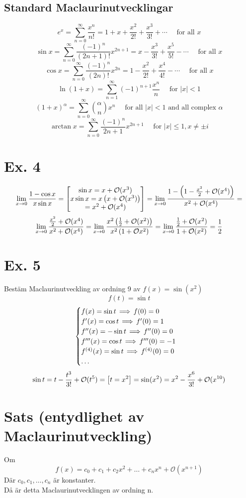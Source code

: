 \documentclass{article}
\newcommand{\Or}{{\mathcal{O}}}
\begin{document}
  \subsection{Standard Maclaurinutvecklingar}
  $$ e^{x} = \sum^{\infty}_{n=0} \frac{x^n}{n!} = 1 + x + \frac{x^2}{2!} + \frac{x^3}{3!} + \cdots\quad\text{ for all } x\! $$
  $$ \sin x = \sum^{\infty}_{n=0} \frac{(-1)^n}{(2n+1)!} x^{2n+1} = x - \frac{x^3}{3!} + \frac{x^5}{5!} - \cdots\quad\text{ for all } x\! $$
  $$ \cos x = \sum^{\infty}_{n=0} \frac{(-1)^n}{(2n)!} x^{2n} = 1 - \frac{x^2}{2!} + \frac{x^4}{4!} - \cdots\quad\text{ for all } x\! $$
  $$ \ln(1+x) = \sum^\infty_{n=1} (-1)^{n+1}\frac{x^n}n\quad\text{ for } |x| < 1 $$
  $$ (1+x)^\alpha = \sum_{n=0}^\infty {\alpha \choose n} x^n\quad\text{ for all }|x| < 1 \text{ and all complex } \alpha\! $$
  $$ \arctan x = \sum^{\infty}_{n=0} \frac{(-1)^n}{2n+1} x^{2n+1}\quad\text{ for }|x| \le 1, x\not=\pm i\! $$

  \section{Ex. 4}
  $$ \lim_{x \to 0} \f{1-\cos x}{x \sin x} = \bmat{ \sin x = x+\Or(x^3)\\ x\sin x = x\pa{x+\Or(x^3)}\\ = x^2 + \Or(x^4) } = \lim_{x\to 0} \f{1-\pa{1-\f {x^2}2 + \Or(x^4) }}{x^2 + \Or(x^4)} =$$
  $$ \lim_{x\to 0} \f{\f {x^2}2 + \Or(x^4)}{x^2 + \Or(x^4)} = \lim_{x\to 0} \f{x^2\pa{\f 12 + \Or(x^2)}}{x^2\pa{1+\Or{x^2}}} = \lim_{x\to 0} \f {\f 12 + \Or(x^2)}{1+\Or(x^2)} = \f 12 $$

  \section{Ex. 5}
  Bestäm Maclaurinutveckling av ordning 9 av $f(x)=\sin(x^2)$
  $$ f(t) = \sin t $$
  $$
  \begin{cases}
    f(x) = \sin t \operatorname{\implies} f(0) = 0\\
    f'(x) = \cos t \operatorname{\implies} f'(0) = 1\\
    f''(x) = -\sin t \operatorname{\implies} f''(0) = 0\\
    f'''(x) = \cos t \operatorname{\implies} f'''(0) = -1\\
    f^{(4)}(x) = \sin t \operatorname{\implies} f^{(4)}(0) = 0\\
    \dots
  \end{cases}
  $$
  $$ \sin t = t - \f {t^3}{3!} + \Or(t^5) = \bra{t=x^2} = \sin(x^2) = x^2 - \f {x^6}{3!} + \Or(x^{10})$$

  \section{Sats (entydlighet av Maclaurinutveckling)}
  Om
  $$ f(x) = c_0 + c_1 + c_2x^2 + \dots + c_nx^n + \Or(x^{n+1}) $$
  Där $ c_0, c_1, \dots, c_n $ är konstanter.\\
  Då är detta Maclaurinutvecklingen av ordning n.\\
\end{document}
